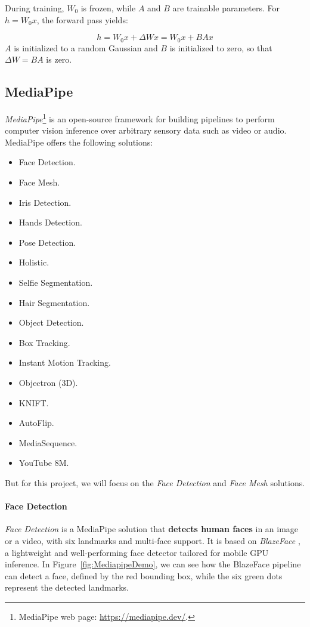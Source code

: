 \documentclass[preprint]{elsarticle}
\begin{document}
During training, $W_0$ is frozen, while $A$ and $B$ are trainable parameters.
For $h = W_0x$, the forward pass yields:

\begin{equation}
	h = W_0x + \Delta Wx = W_0x + BAx
\end{equation}
$A$ is initialized to a random Gaussian and $B$ is initialized to zero, so that
$\Delta W = BA$ is zero.



\subsection{MediaPipe}

\emph{MediaPipe}\footnote{MediaPipe web page: \url{https://mediapipe.dev/}.} 
is an open-source framework for building pipelines to perform computer vision 
inference over arbitrary sensory data such as video or audio.
MediaPipe offers the following solutions:

\begin{itemize}
	\item Face Detection.
	\item Face Mesh.
	\item Iris Detection.
	\item Hands Detection.
	\item Pose Detection.
	\item Holistic.
	\item Selfie Segmentation.
	\item Hair Segmentation.
	\item Object Detection.
	\item Box Tracking.
	\item Instant Motion Tracking.
	\item Objectron (3D).
	\item KNIFT.
	\item AutoFlip.
	\item MediaSequence.
	\item YouTube 8M.
\end{itemize}
But for this project, we will focus on the \emph{Face Detection} and \emph{Face Mesh} solutions.

\paragraph{Face Detection}


\emph{Face Detection} is a MediaPipe solution that \textbf{detects human faces} in an image or a video,
with six landmarks and multi-face support.
It is based on \emph{BlazeFace} \cite{bazarevsky2019blazeface}, a lightweight and well-performing 
face detector tailored for mobile GPU inference.
In Figure~\ref{fig:MediapipeDemo}, we can see how the BlazeFace pipeline can detect a face, defined by the red bounding box, while the six green dots represent the detected landmarks.
\end{document}
